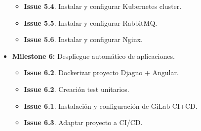 \begin{text}
\begin{itemize}
\begin{itemize}
					\item \textbf{Issue 5.4}. Instalar y configurar Kubernetes cluster.
					\item \textbf{Issue 5.5}. Instalar y configurar RabbitMQ.
					\item \textbf{Issue 5.6}. Instalar y configurar Nginx.
				\end{itemize}
			\item \textbf{Milestone 6:} Despliegue automático de aplicaciones.
				\begin{itemize}
					\item \textbf{Issue 6.2}. Dockerizar proyecto Djagno + Angular.
					\item \textbf{Issue 6.2}. Creación test unitarios.
					\item \textbf{Issue 6.1}. Instalación y configuración de GiLab CI+CD.
					\item \textbf{Issue 6.3}. Adaptar proyecto a CI/CD.
				\end{itemize}
		\end{itemize}
	\end{text}



		
